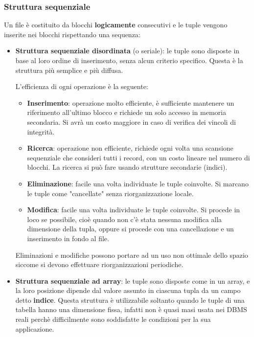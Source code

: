 \documentclass[a4paper]{article}
\begin{document}
\subsubsection{Struttura sequenziale}
Un file è costituito da blocchi \textbf{logicamente} consecutivi e le tuple vengono
inserite nei blocchi rispettando una sequenza:
\begin{itemize}
  \item \textbf{Struttura sequenziale disordinata} (o seriale): le tuple sono disposte
    in base al loro ordine di inserimento, senza alcun criterio specifico. Questa è
    la struttura più semplice e più diffusa.

    L'efficienza di ogni operazione è la seguente:
    \begin{itemize}
      \item \textbf{Inserimento}: operazione molto efficiente, è sufficiente mantenere
        un riferimento all'ultimo blocco e richiede un solo accesso in memoria
        secondaria. Si avrà un costo maggiore in caso di verifica dei vincoli di
        integrità.

      \item \textbf{Ricerca}: operazione non efficiente, richiede ogni volta una
        scansione sequenziale che consideri tutti i record, con un costo lineare
        nel numero di blocchi. La ricerca si può fare usando strutture secondarie
        (indici).

      \item \textbf{Eliminazione}: facile una volta individuate le tuple
        coinvolte. Si marcano le tuple come "cancellate" senza riorganizzazione locale.

      \item \textbf{Modifica}: facile una volta individuate le tuple coinvolte. Si
        procede in loco se possibile, cioè quando non c'è stata nessuna modifica alla
        dimensione della tupla, oppure si procede con una cancellazione e un
        inserimento in fondo al file.
    \end{itemize}
    Eliminazioni e modifiche possono portare ad un uso non ottimale dello spazio
    siccome si devono effettuare riorganizzazioni periodiche.

  \item \textbf{Struttura sequenziale ad array}: le tuple sono disposte come in un
    array, e la loro posizione dipende dal valore assunto in ciascuna tupla da un
    campo detto \textbf{indice}. Questa struttura è utilizzabile soltanto quando
    le tuple di una tabella hanno una dimensione fissa, infatti non è quasi masi usata
    nei DBMS reali perchè difficilmente sono soddisfatte le condizioni per la sua
    applicazione.


\end{itemize}
\end{document}
